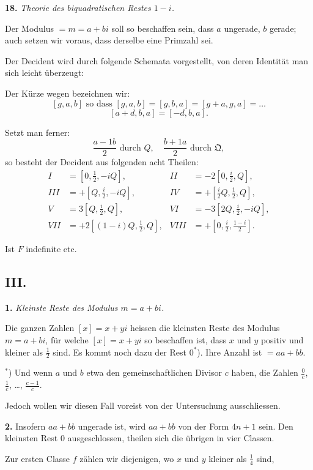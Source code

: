 \documentclass[12pt,a4paper]{article}
\begin{document}
\textbf{18.} \textit{Theorie des biquadratischen Restes $1 - i$.}

Der Modulus $= m = a + bi$ soll so beschaffen sein, dass $a$ ungerade, $b$ gerade; auch setzen
wir voraus, dass derselbe eine Primzahl sei.

Der Decident wird durch folgende Schemata vorgestellt, von deren Identität man sich leicht
überzeugt:

Der Kürze wegen bezeichnen wir:
\[
[g, a, b] \text{ so dass } [g, a, b] = [g, b, a] = [g + a, g, a] = \ldots
\]
\[
[a + d, b, a] = [-d, b, a].
\]

Setzt man ferner:
\[
\frac{a - 1b}{2} \text{ durch } Q, \quad \frac{b + 1a}{2} \text{ durch } \mathfrak{Q},
\]
so besteht der Decident aus folgenden acht Theilen:
\begin{align*}
I &= [0, \tfrac{1}{2}, -iQ], & II &= -2[0, \tfrac{i}{2}, Q], \\
III &= +[Q, \tfrac{i}{2}, -iQ], & IV &= +[\tfrac{i}{2}Q, \tfrac{1}{2}, Q], \\
V &= 3[Q, \tfrac{i}{2}, Q], & VI &= -3[2Q, \tfrac{i}{2}, -iQ], \\
VII &= +2[(1 - i)Q, \tfrac{1}{2}, Q], & VIII &= +[0, \tfrac{i}{2}, \tfrac{1 - i}{2}].
\end{align*}

Ist $F$ indefinite etc.


\subsection*{III.}

\textbf{1.} \textit{Kleinste Reste des Modulus $m = a + bi$.}

Die ganzen Zahlen $[x] = x + yi$ heissen die kleinsten Reste des Modulus $m = a + bi$,
für welche $[x] = x + yi$ so beschaffen ist, dass $x$ und $y$ positiv und kleiner als $\frac{1}{2}$ sind.
Es kommt noch dazu der Rest $0^*$). Ihre Anzahl ist $= aa + bb$.

$^*$) Und wenn $a$ und $b$ etwa den gemeinschaftlichen Divisor $c$ haben, die Zahlen $\frac{0}{c}$, $\frac{1}{c}$,
\ldots{}, $\frac{c-1}{c}$.

Jedoch wollen wir diesen Fall voreist von der Untersuchung ausschliessen.

\textbf{2.} Insofern $aa + bb$ ungerade ist, wird $aa + bb$ von der Form $4n + 1$ sein.
Den kleinsten Rest $0$ ausgeschlossen, theilen sich die übrigen in vier Classen.

Zur ersten Classe $f$ zählen wir diejenigen, wo $x$ und $y$ kleiner als $\frac{1}{4}$ sind,
\end{document}
